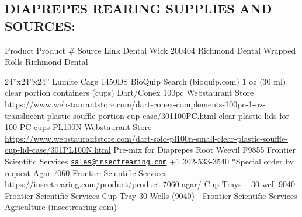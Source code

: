\documentclass{sop_class}[overrideChapters] %
\begin{document}
{\hypertarget{diaprepes-rearing-supplies-and-sources}{%
\subsection{DIAPREPES REARING SUPPLIES AND SOURCES:}\label{diaprepes-rearing-supplies-and-sources}}

Product Product \# Source Link Dental Wick 200404 Richmond Dental
Wrapped Rolls \textbar{} Richmond Dental

24''x24''x24'' Lumite Cage 1450DS BioQuip Search (bioquip.com) 1 oz (30 ml)
clear portion containers (cups) Dart/Conex 100pc Webstaurant Store
\url{https://www.webstaurantstore.com/dart-conex-complements-100pc-1-oz-translucent-plastic-souffle-portion-cup-case/301100PC.html}
clear plastic lids for 100 PC cups PL100N Webstaurant Store
\url{https://www.webstaurantstore.com/dart-solo-pl100n-small-clear-plastic-souffle-cup-lid-case/301PL100N.html}
Pre-mix for Diaprepes Root Weevil F9855 Frontier Scientific Services
\href{mailto:sales@insectrearing.com}{\nolinkurl{sales@insectrearing.com}} +1
302-533-3540 *Special order by request Agar 7060 Frontier Scientific
Services \url{https://insectrearing.com/product/product-7060-agar/} Cup
Trays -- 30 well 9040 Frontier Scientific Services Cup Tray-30 Wells
(9040) - Frontier Scientific Services Agriculture (insectrearing.com)

\clearpage
\begin{landscape} %

\end{landscape}}
\end{document}
